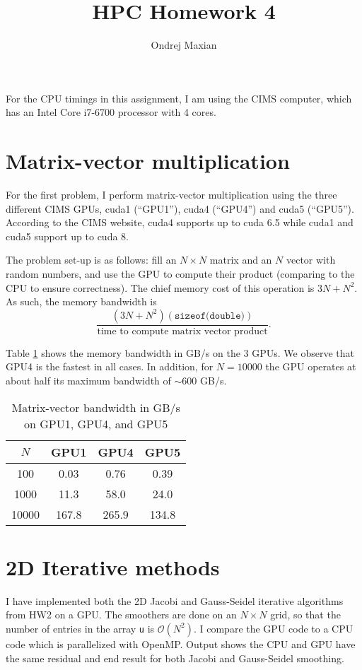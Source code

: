 \documentclass[a4paper]{article}
\title{HPC Homework 4}
\author{Ondrej Maxian}
\begin{document}
\maketitle
For the CPU timings in this assignment, I am using the CIMS computer, which has an Intel Core i7-6700 processor with 4 cores. 
\section{Matrix-vector multiplication}
For the first problem, I perform matrix-vector multiplication using the three different CIMS GPUs, cuda1 (``GPU1''), cuda4 (``GPU4'') and cuda5 (``GPU5''). According to the CIMS website, cuda4 supports up to cuda 6.5 while  cuda1 and cuda5 support up to cuda 8. 

The problem set-up is as follows: fill an $N \times N$ matrix and an $N$ vector with random numbers, and use the GPU to compute their product (comparing to the CPU to ensure correctness). The chief memory cost of this operation is $3N+N^2$. As such, the memory bandwidth is $$\frac{(3N+N^2)(\texttt{sizeof(double)})}{\textrm{time to compute matrix vector product}}.$$

Table \ref{tab:mvtime} shows the memory bandwidth in GB/s on the 3 GPUs. We observe that GPU4 is the fastest in all cases. In addition, for $N=10000$ the GPU operates at about half its maximum bandwidth of $\sim 600$ GB/s. 

\begin{table}[ht]
\centering
\begin{tabular}{c|c|c|c}
$N$ & GPU1 & GPU4 & GPU5\\[2 pt] \hline
100 & 0.03 & 0.76 & 0.39  \\[2 pt]
1000 & 11.3 & 58.0 & 24.0 \\[2 pt]
10000 & 167.8 & 265.9 & 134.8
\end{tabular}
\caption{Matrix-vector bandwidth in GB/s on GPU1, GPU4, and GPU5}
\label{tab:mvtime}
\end{table}

\section{2D Iterative methods}
I have implemented both the 2D Jacobi and Gauss-Seidel iterative algorithms from HW2 on a GPU. The smoothers are done on an $N \times N$ grid, so that the number of entries in the array \texttt{u} is $\mathcal{O}(N^2)$. I compare the GPU code to a CPU code which is parallelized with OpenMP. Output shows the CPU and GPU have the same residual and end result for both Jacobi and Gauss-Seidel smoothing. 
\end{document}
